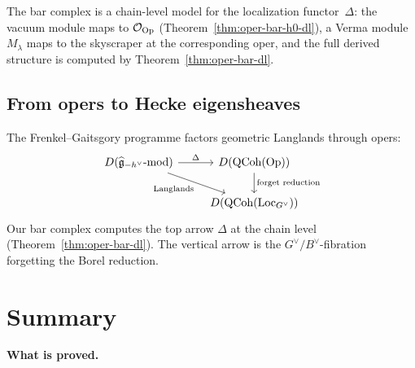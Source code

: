 \begin{remark}
\label{rem:bar-as-localization}
The bar complex is a chain-level model for the localization
functor~$\Delta$: the vacuum module maps to $\mathcal{O}_{\mathrm{Op}}$
(Theorem~\ref{thm:oper-bar-h0-dl}), a Verma module $M_\lambda$ maps
to the skyscraper at the corresponding oper, and the full derived
structure is computed by Theorem~\ref{thm:oper-bar-dl}.
\end{remark}

\subsection{From opers to Hecke eigensheaves}

\begin{remark}
\label{rem:langlands-path}
The Frenkel--Gaitsgory programme factors geometric Langlands through
opers:
\[
\begin{tikzcd}
D(\widehat{\fg}_{-h^\vee}\text{-mod})
  \arrow[r, "\Delta"]
  \arrow[dr, "\text{Langlands}"']
& D(\mathrm{QCoh}(\mathrm{Op}))
  \arrow[d, "\text{forget reduction}"] \\
& D(\mathrm{QCoh}(\mathrm{Loc}_{G^\vee}))
\end{tikzcd}
\]
Our bar complex computes the top arrow $\Delta$ at the chain level
(Theorem~\ref{thm:oper-bar-dl}).  The vertical arrow is the
$G^\vee/B^\vee$-fibration forgetting the Borel reduction.
\end{remark}



\section{Summary}
\label{sec:derived-langlands-summary}

\noindent
\textbf{What is proved.}

